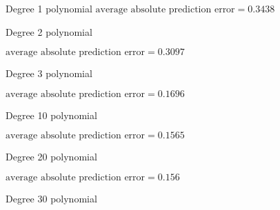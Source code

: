 \documentclass{beamer}\usepackage[]{graphicx}\usepackage[]{color}
\newenvironment{knitrout}{}{} %
\begin{document}
\begin{darkframes}
\begin{frame}{Degree 1 polynomial}
\begin{knitrout}
\end{knitrout}
      \vspace{-1cm} $\text{average absolute prediction error} = 0.3438$
    \end{frame}

    \begin{frame}{Degree 2 polynomial}
\begin{knitrout}


\end{knitrout}
      \vspace{-1cm} $\text{average absolute prediction error} = 0.3097$
    \end{frame}

    \begin{frame}{Degree 3 polynomial}
\begin{knitrout}


\end{knitrout}
      \vspace{-1cm} $\text{average absolute prediction error} = 0.1696$
    \end{frame}

    \begin{frame}{Degree 10 polynomial}
\begin{knitrout}


\end{knitrout}
      \vspace{-1cm} $\text{average absolute prediction error} = 0.1565$
    \end{frame}

    \begin{frame}{Degree 20 polynomial}
\begin{knitrout}


\end{knitrout}
      \vspace{-1cm} $\text{average absolute prediction error} = 0.156$
    \end{frame}

    \begin{frame}{Degree 30 polynomial}
\begin{knitrout}



\end{knitrout}
\end{frame}
\end{darkframes}
\end{document}
